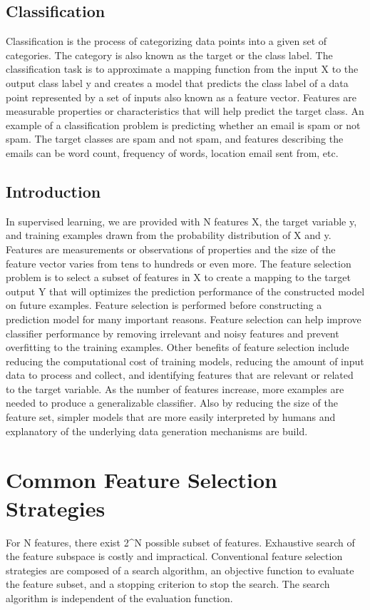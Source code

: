 \subsection{Classification}
\indent Classification is the process of categorizing data points into a given set of categories. The category is also known as the target or the class label. The classification task is to approximate a mapping function from the input X to the output class label y and creates a model that predicts the class label of a data point represented by a set of inputs also known as a feature vector. Features are measurable properties or characteristics that will help predict the target class. An example of a classification problem is predicting whether an email is spam or not spam. The target classes are spam and not spam, and features describing the emails can be word count, frequency of words, location email sent from, etc. 

\subsection{Introduction}

\indent In supervised learning, we are provided with N features X, the target variable y, and training examples drawn from the probability distribution of X and y. Features are measurements or observations of properties and the size of the feature vector varies from tens to hundreds or even more. The feature selection problem is to select a subset of features in X to create a mapping to the target output Y that will optimizes the prediction performance of the constructed model on future examples. 
\indent Feature selection is performed before constructing a prediction model for many important reasons. Feature selection can help improve classifier performance by removing irrelevant and noisy features and prevent overfitting to the training examples. Other benefits of feature selection include reducing the computational cost of training models, reducing the amount of input data to process and collect, and identifying features that are relevant or related to the target variable. As the number of features increase, more examples are needed to produce a generalizable classifier. Also by reducing the size of the feature set, simpler models that are more easily interpreted by humans and explanatory of the underlying data generation mechanisms are build.  

\section{Common Feature Selection Strategies}
\indent For N features, there exist 2^N possible subset of features. Exhaustive search of the feature subspace is costly and impractical. Conventional feature selection strategies are composed of a search algorithm, an objective function to evaluate the feature subset, and a stopping criterion to stop the search. The search algorithm is independent of the evaluation function.

